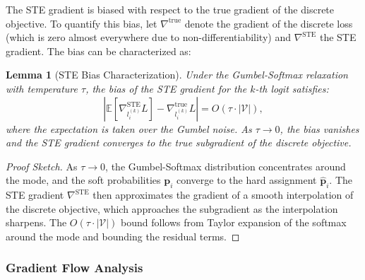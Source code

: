 ﻿\documentclass[lettersize,journal]{IEEEtran}
\newtheorem{lemma}{Lemma}
\begin{document}
The STE gradient is biased with respect to the true gradient of the discrete objective. To quantify this bias, let $\nabla^{\text{true}}$ denote the gradient of the discrete loss (which is zero almost everywhere due to non-differentiability) and $\nabla^{\text{STE}}$ the STE gradient. The bias can be characterized as:

\begin{lemma}[STE Bias Characterization]
\label{lem:ste_bias}
Under the Gumbel-Softmax relaxation with temperature $\tau$, the bias of the STE gradient for the $k$-th logit satisfies:
\begin{equation}
\label{eq:ste_bias}
\left| \mathbb{E}\left[\nabla^{\text{STE}}_{l_i^{(k)}} L\right] - \nabla^{\text{true}}_{l_i^{(k)}} L \right| = O(\tau \cdot |\mathcal{V}|),
\end{equation}
where the expectation is taken over the Gumbel noise. As $\tau \to 0$, the bias vanishes and the STE gradient converges to the true subgradient of the discrete objective.
\end{lemma}

\begin{proof}[Proof Sketch]
As $\tau \to 0$, the Gumbel-Softmax distribution concentrates around the mode, and the soft probabilities $\mathbf{p}_i$ converge to the hard assignment $\hat{\mathbf{p}}_i$. The STE gradient $\nabla^{\text{STE}}$ then approximates the gradient of a smooth interpolation of the discrete objective, which approaches the subgradient as the interpolation sharpens. The $O(\tau \cdot |\mathcal{V}|)$ bound follows from Taylor expansion of the softmax around the mode and bounding the residual terms.
\end{proof}

\subsubsection{Gradient Flow Analysis}
\label{sec:gradient_flow}
\end{document}

